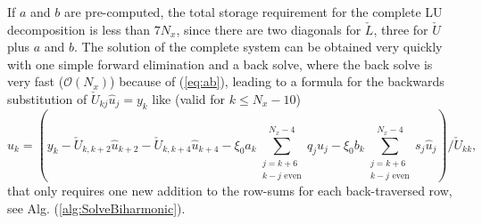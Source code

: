 \documentclass[preprint]{elsarticle}
\newcommand{\N}[1]{\check{#1}}
\begin{document}
If $a$ and $b$
are pre-computed, 
the total storage requirement for the complete LU decomposition is less than 
$7N_x$, since there are two diagonals for $\N{L}$, three for $\N{U}$ plus ${a}$ and 
${b}$. The solution of the complete system can be obtained very quickly with 
one simple forward elimination and a back solve, where the back 
solve is very fast ($\mathcal{O}(N_x)$) because of (\ref{eq:ab}), leading 
to a formula for the backwards substitution of $\N{U}_{kj} \hat{u}_j = y_k$ like (valid for $k \le N_x-10$)
\begin{equation}
\hat{u}_k = \left(y_k - \N{U}_{k, k+2} \hat{u}_{k+2} - \N{U}_{k, k+4} \hat{u}_{k+4} - 
\xi_0 a_k\sum_{\substack{j=k+6\\k-j \text{ even}}}^{N_x-4} q_j \hat{u}_j - 
\xi_0 b_k\sum_{\substack{j=k+6\\k-j \text{ even}}}^{N_x-4} 
s_j \hat{u}_j\right)/\N{U}_{kk},
\end{equation}
that only requires 
one new addition to the row-sums for each back-traversed
row, see Alg. (\ref{alg:SolveBiharmonic}).
\end{document}
